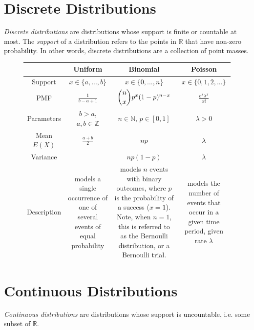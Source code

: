\label{lab:distributions}

\section*{Discrete Distributions}
\emph{Discrete distributions} are distributions whose support is finite or countable at most. 
The \emph{support} of a distribution refers to the points in $\mathbb{R}$ that have non-zero probability. 
In other words, discrete distributions are a collection of point masses. 

\begin{figure}[h]
\begin{center}
\begin{tabular}{|c|c|c|c|}
	\hline
 & Uniform &  Binomial & Poisson \\
\hline 
\hline
Support&$x \in \{a,...,b\}$&$x \in \{0,...,n\}$&$x \in \{0,1,2,...\}$\\ \hline
PMF&$\frac{1}{b-a+1}$&$\dbinom{n}{x}p^x(1-p)^{n-x}$&$\frac{e^\lambda \lambda^x}{x!}$\\ \hline
Parameters&$b>a$, $a,b \in \mathbb{Z}$&$n \in \mathbb{N}$, $p \in [0,1]$& $\lambda>0$\\ \hline
Mean $E(X)$&$\frac{a+b}{2}$&$np$& $\lambda$\\ \hline
Variance&&$np(1-p)$& $\lambda$\\ \hline
Description& 
\parbox{1in}{models a single occurrence of one of several events of equal probability} & \parbox{1in}{models $n$ events with binary outcomes, where $p$ is the probability of a success ($x=1$). Note, when $n=1$, this is referred to as the Bernoulli distribution, or a Bernoulli trial.}&\parbox{1in}{models the number of events that occur in a given time period, given rate $\lambda$}\\
\hline
\end{tabular}
\end{center}
\end{figure}

\section*{Continuous Distributions}
\emph{Continuous distributions} are distributions whose support is uncountable, i.e. some subset of $\mathbb{R}$. 

